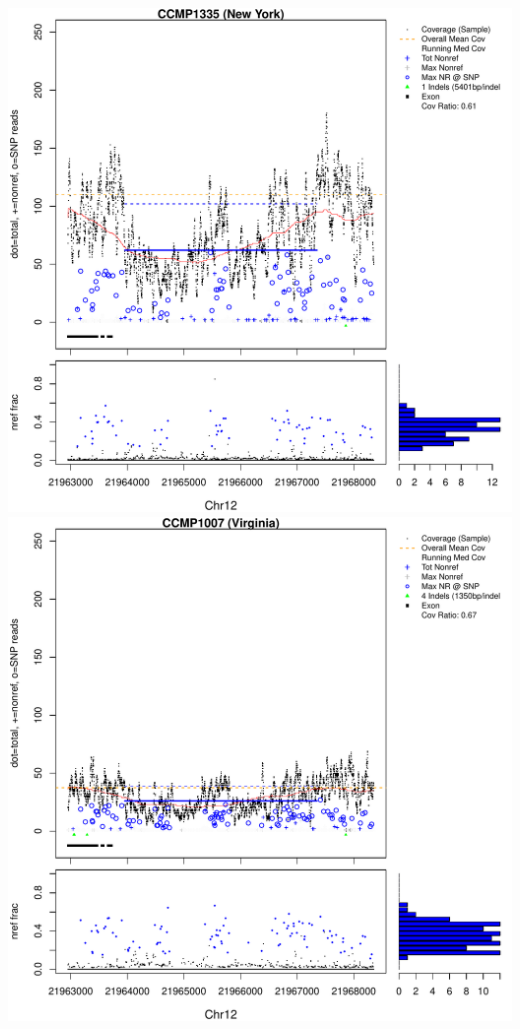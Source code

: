 \documentclass{article}\usepackage[]{graphicx}\usepackage[]{color}
\makeatletter
\def\maxwidth{ %
  \ifdim\Gin@nat@width>\linewidth
    \linewidth
  \else
    \Gin@nat@width
  \fi
}
\newenvironment{knitrout}{}{} %
\makeatother
\begin{document}
\begin{knitrout}
{\centering \includegraphics[width=\maxwidth]{figs-knitr/unnamed-chunk-54-1} 
\includegraphics[width=\maxwidth]{figs-knitr/unnamed-chunk-54-2} 
}
\end{knitrout}
\end{document}

